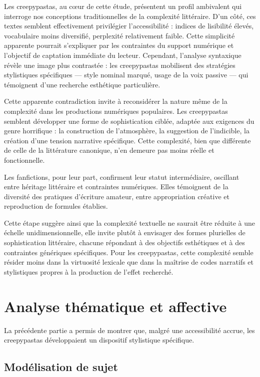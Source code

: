 \documentclass[12pt,a4paper,oneside,titlepage]{book} %
\begin{document}
Les creepypastas, au cœur de cette étude, présentent un profil ambivalent qui interroge nos conceptions traditionnelles de la complexité littéraire. D'un côté, ces textes semblent effectivement privilégier l'accessibilité : indices de lisibilité élevés, vocabulaire moins diversifié, perplexité relativement faible. Cette simplicité apparente pourrait s'expliquer par les contraintes du support numérique et l'objectif de captation immédiate du lecteur. Cependant, l'analyse syntaxique révèle une image plus contrastée : les creepypastas mobilisent des stratégies stylistiques spécifiques — style nominal marqué, usage de la voix passive — qui témoignent d'une recherche esthétique particulière.

Cette apparente contradiction invite à reconsidérer la nature même de la complexité dans les productions numériques populaires. Les creepypastas semblent développer une forme de sophistication ciblée, adaptée aux exigences du genre horrifique : la construction de l'atmosphère, la suggestion de l'indicible, la création d'une tension narrative spécifique. Cette complexité, bien que différente de celle de la littérature canonique, n'en demeure pas moins réelle et fonctionnelle.

Les fanfictions, pour leur part, confirment leur statut intermédiaire, oscillant entre héritage littéraire et contraintes numériques. Elles témoignent de la diversité des pratiques d'écriture amateur, entre appropriation créative et reproduction de formules établies.

Cette étape suggère ainsi que la complexité textuelle ne saurait être réduite à une échelle unidimensionnelle, elle invite plutôt à envisager des formes plurielles de sophistication littéraire, chacune répondant à des objectifs esthétiques et à des contraintes génériques spécifiques. Pour les creepypastas, cette complexité semble résider moins dans la virtuosité lexicale que dans la maîtrise de codes narratifs et stylistiques propres à la production de l'effet recherché.

\section{ Analyse thématique et affective}
La précédente partie a permis de montrer que, malgré une accessibilité accrue, les creepypastas développaient un dispositif stylistique spécifique.


	\subsection{Modélisation de sujet}
	\label{section_topic}
\end{document}
